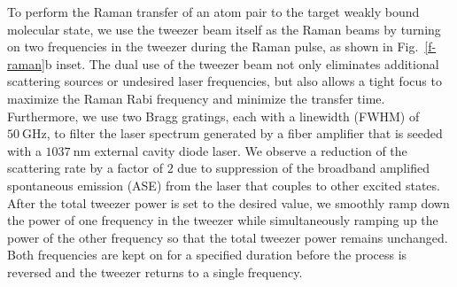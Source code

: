 \documentclass[aps,prl,twocolumn,10pt,superscriptaddress]{revtex4-1}
\newcommand{\Na}{\mathrm{Na}}
\newcommand{\Cs}{\mathrm{Cs}}
\begin{document}
To perform the Raman transfer of an atom pair to the target weakly bound molecular state,
we use the tweezer beam itself as the Raman beams by turning on two frequencies
in the tweezer during the Raman pulse, as shown in Fig.~\ref{f-raman}b inset.
The dual use of the tweezer beam not only eliminates additional scattering sources
or undesired laser frequencies,
but also allows a tight focus to maximize the Raman Rabi frequency
and minimize the transfer time.
Furthermore, we use two Bragg gratings, each with a linewidth (FWHM) of $50~\mathrm{GHz}$,
to filter the laser spectrum generated by a fiber amplifier
that is seeded with a $1037~\mathrm{nm}$ external cavity diode laser.
We observe a reduction of the scattering rate by a factor of $2$
due to suppression of the broadband amplified spontaneous emission (ASE) from the laser
that couples to other excited states.
After the total tweezer power is set to the desired value,
we smoothly ramp down the power of one frequency in the tweezer
while simultaneously ramping up the power of the other frequency
so that the total tweezer power remains unchanged.
Both frequencies are kept on for a specified duration before the process is reversed
and the tweezer returns to a single frequency.





\end{document}
